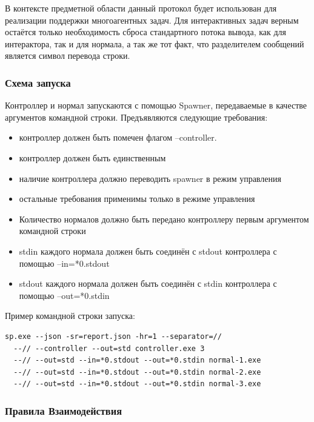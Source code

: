 \documentclass{imcs}
\begin{document}
В контексте предметной области данный протокол будет использован для реализации поддержки многоагентных задач. Для интерактивных задач верным остаётся только необходимость сброса стандартного потока вывода, как для интерактора, так и для нормала, а так же тот факт, что разделителем сообщений является символ перевода строки.

\subsubsection{Схема запуска}
Контроллер и нормал запускаются с помощью Spawner, передаваемые в качестве аргументов командной строки. Предъявляются следующие требования:

\begin{itemize}
\item контроллер должен быть помечен флагом --controller.
\item контроллер должен быть единственным
\item наличие контроллера должно переводить spawner в режим управления
\item остальные требования применимы только в режиме управления
\item Количество нормалов должно быть передано контроллеру первым аргументом командной строки
\item stdin каждого нормала должен быть соединён с stdout контроллера с помощью --in=*0.stdout
\item stdout каждого нормала должен быть соединён с stdin контроллера с помощью --out=*0.stdin
\end{itemize}

Пример командной строки запуска:
\begin{lstlisting}
sp.exe --json -sr=report.json -hr=1 --separator=//
  --// --controller --out=std controller.exe 3
  --// --out=std --in=*0.stdout --out=*0.stdin normal-1.exe
  --// --out=std --in=*0.stdout --out=*0.stdin normal-2.exe
  --// --out=std --in=*0.stdout --out=*0.stdin normal-3.exe
\end{lstlisting}

\subsubsection{Правила Взаимодействия}
\end{document}
